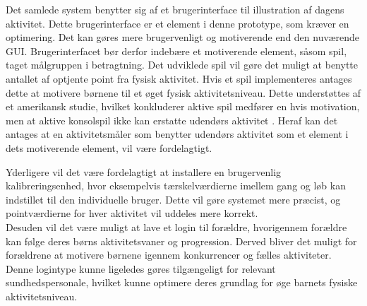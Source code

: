 Det samlede system benytter sig af et brugerinterface til illustration af dagens aktivitet. Dette brugerinterface er et element i denne prototype, som kræver en optimering. Det kan gøres mere brugervenligt og motiverende end den nuværende GUI. Brugerinterfacet bør derfor indebære et motiverende element, såsom spil, taget målgruppen i betragtning. Det udviklede spil vil gøre det muligt at benytte antallet af optjente point fra fysisk aktivitet. Hvis et spil implementeres antages dette at motivere børnene til et øget fysisk aktivitetsniveau. Dette understøttes af et amerikansk studie, hvilket konkluderer aktive spil medfører en hvis motivation, men at aktive konsolspil ikke kan erstatte udendørs aktivitet \citep{Oestergaard2012}. Heraf kan det antages at en aktivitetsmåler som benytter udendørs aktivitet som et element i dets motiverende element, vil være fordelagtigt.

Yderligere vil det være fordelagtigt at installere en brugervenlig kalibreringsenhed, hvor eksempelvis tærskelværdierne imellem gang og løb kan indstillet til den individuelle bruger. Dette vil gøre systemet mere præcist, og pointværdierne for hver aktivitet vil uddeles mere korrekt. \\
Desuden vil det være muligt at lave et login til forældre, hvorigennem forældre kan følge deres børns aktivitetsvaner og progression. Derved bliver det muligt for forældrene at motivere børnene igennem konkurrencer og fælles aktiviteter. Denne logintype kunne ligeledes gøres tilgængeligt for relevant sundhedspersonale, hvilket kunne optimere deres grundlag for øge barnets fysiske aktivitetsniveau.